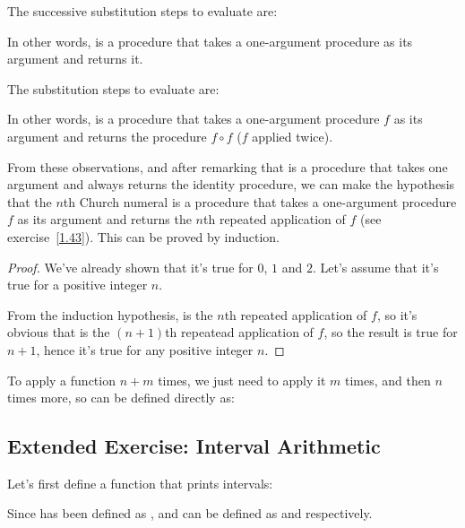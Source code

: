 \begin{exe}[2.6]
    The successive substitution steps to evaluate  are:

    In other words,  is a procedure that takes a one-argument 
    procedure as its argument and returns it.

    The substitution steps to evaluate  are:

    In other words,  is a procedure that takes a one-argument 
    procedure $f$ as its argument and returns the procedure $f \circ f$ ($f$ 
    applied twice).

    From these observations, and after remarking that  is a procedure 
    that takes one argument and always returns the identity procedure, we can 
    make the hypothesis that the $n$th Church numeral is a procedure that takes 
    a one-argument procedure $f$ as its argument and returns the $n$th repeated 
    application of $f$ (see exercise~\ref{1.43}). This can be proved by 
    induction.

    \begin{proof}
        We’ve already shown that it’s true for $0$, $1$ and $2$.
        Let’s assume that it’s true for a positive integer $n$.

        From the induction hypothesis,  is the $n$th repeated 
        application of $f$, so it’s obvious that
         is the $(n + 1)$th repeatead 
        application of $f$, so the result is true for $n + 1$, hence it’s true 
        for any positive integer $n$.
    \end{proof}

    To apply a function $n + m$ times, we just need to apply it $m$ times, and 
    then $n$ times more, so \vscm{+} can be defined directly as:
\end{exe}

\subsection{Extended Exercise: Interval Arithmetic}

Let’s first define a function that prints intervals:

\begin{exe}[2.7]
    Since  has been defined as , 
     and  can be defined as  and 
     respectively.
\end{exe}

